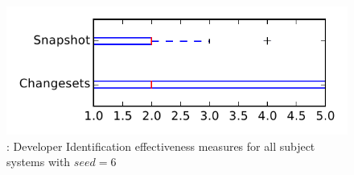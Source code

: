 
\begin{figure}
\centering
\includegraphics[height=0.4\textheight]{figures/dit_seed/rq1_tiny_6}
\caption{\rtwo: Developer Identification effectiveness measures for all subject systems with $seed=6$}
\label{fig:dit_seed:rq1:tiny}
\end{figure}
